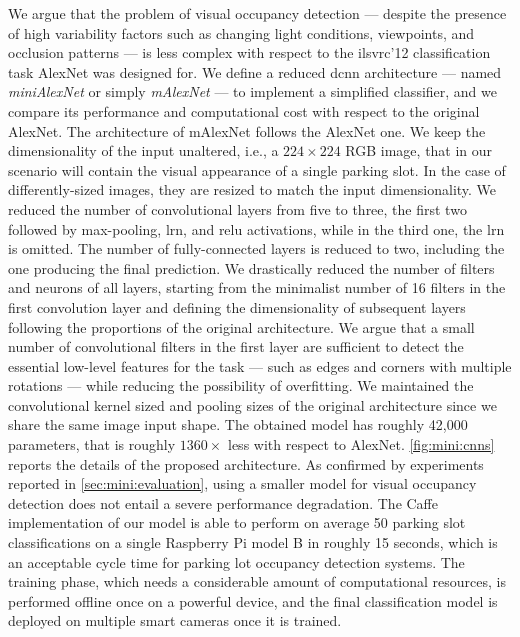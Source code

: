 We argue that the problem of visual occupancy detection --- despite the presence of high variability factors such as changing light conditions, viewpoints, and occlusion patterns --- is less complex with respect to the \gls{ilsvrc}'12 classification task AlexNet was designed for.
We define a reduced \gls{dcnn} architecture --- named \emph{miniAlexNet} or simply \emph{mAlexNet} --- to implement a simplified classifier, and we compare its performance and computational cost with respect to the original AlexNet.
The architecture of mAlexNet follows the AlexNet one.
We keep the dimensionality of the input unaltered, i.e., a $224 \times 224$ RGB image, that in our scenario will contain the visual appearance of a single parking slot.
In the case of differently-sized images, they are resized to match the input dimensionality.
We reduced the number of convolutional layers from five to three, the first two followed by max-pooling, \gls{lrn}, and \gls{relu} activations, while in the third one, the \gls{lrn} is omitted.
The number of fully-connected layers is reduced to two, including the one producing the final prediction.
We drastically reduced the number of filters and neurons of all layers, starting from the minimalist number of 16 filters in the first convolution layer and defining the dimensionality of subsequent layers following the proportions of the original architecture.
We argue that a small number of convolutional filters in the first layer are sufficient to detect the essential low-level features for the task --- such as edges and corners with multiple rotations --- while reducing the possibility of overfitting.
We maintained the convolutional kernel sized and pooling sizes of the original architecture since we share the same image input shape.
The obtained model has roughly 42,000 parameters, that is roughly $1360 \times$ less with respect to AlexNet.
\ref{fig:mini:cnns} reports the details of the proposed architecture.
As confirmed by experiments reported in \ref{sec:mini:evaluation}, using a smaller model for visual occupancy detection does not entail a severe performance degradation.
The Caffe implementation of our model is able to perform on average 50 parking slot classifications on a single Raspberry Pi model B in roughly 15 seconds, which is an acceptable cycle time for parking lot occupancy detection systems. %
The training phase, which needs a considerable amount of computational resources, is performed offline once on a powerful device, and the final classification model is deployed on multiple smart cameras once it is trained.


